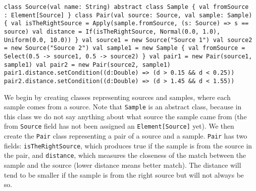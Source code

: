 \begin{flushleft}
\texttt{class Source(val name: String)
\newline
\newline abstract class Sample \{
\newline \tab val fromSource : Element[Source] 
\newline \}
\newline
\newline class Pair(val source: Source, val sample: Sample) \{
\newline \tab val isTheRightSource = Apply(sample.fromSource, (s: Source) => s == source)
\newline \tab val distance = If(isTheRightSource, 
\newline \tab Normal(0.0, 1.0), 
\newline \tab Uniform(0.0, 10.0))
\newline \}
\newline
{}
\newline val source1 = new Source("Source 1") 
\newline val source2 = new Source("Source 2") 
\newline val sample1 = new Sample \{ 
\newline val fromSource = Select(0.5 -> source1, 0.5 -> source2)
\newline \}
\newline val pair1 = new Pair(source1, sample1)
\newline val pair2 = new Pair(source2, sample1)
\newline 
\newline pair1.distance.setCondition((d:Double) => (d > 0.15 \&\& d < 0.25))
\newline pair2.distance.setCondition((d:Double) => (d > 1.45 \&\& d < 1.55)) }
\end{flushleft}

We begin by creating classes representing sources and samples, where each sample comes from a source. Note that \texttt{Sample} is an abstract class, because in this class we do not say anything about what source the sample came from (the from \texttt{Source} field has not been assigned an \texttt{Element[Source]} yet). We then create the \texttt{Pair} class representing a pair of a source and a sample. \texttt{Pair} has two fields: \texttt{isTheRightSource}, which produces true if the sample is from the source in the pair, and \texttt{distance}, which measures the closeness of the match between the sample and the source (lower distance means better match). The distance will tend to be smaller if the sample is from the right source but will not always be so.


